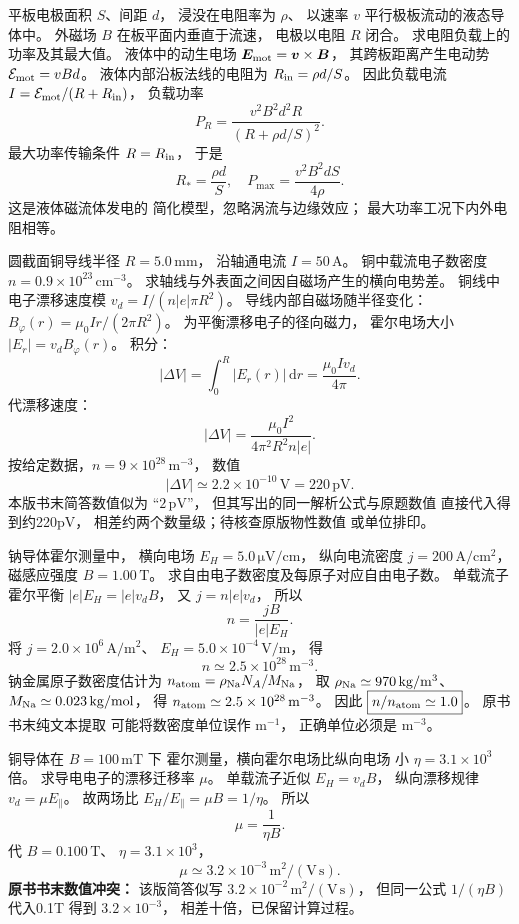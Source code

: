 平板电极面积 $S$、间距 $d$，
浸没在电阻率为 $\rho$、
以速率 $v$ 平行极板流动的液态导体中。
外磁场 $B$ 在板平面内垂直于流速，
电极以电阻 $R$ 闭合。
求电阻负载上的功率及其最大值。
\exsolution
液体中的动生电场
$\bm E_{\rm mot}=\bm v\times\bm B$，
其跨板距离产生电动势
$\mathcal E_{\rm mot}=vBd$。
液体内部沿板法线的电阻为
$R_{\rm in}=\rho d/S$。
因此负载电流
$I=\mathcal E_{\rm mot}/(R+R_{\rm in})$，
负载功率
\[
\boxed{P_R=
\frac{v^2B^2d^2 R}{(R+\rho d/S)^2}}.
\]
最大功率传输条件
$R=R_{\rm in}$，
于是
\[
\boxed{R_*=\frac{\rho d}{S}},
\quad
\boxed{P_{\max}=
\frac{v^2B^2dS}{4\rho}}.
\]
\excheck 这是液体磁流体发电的
简化模型，忽略涡流与边缘效应；
最大功率工况下内外电阻相等。

圆截面铜导线半径
$R=5.0\,\mathrm{mm}$，
沿轴通电流 $I=50\,\mathrm A$。
铜中载流电子数密度
$n=0.9\times10^{23}\,\mathrm{cm^{-3}}$。
求轴线与外表面之间因自磁场产生的横向电势差。
\exsolution
铜线中电子漂移速度模
$v_d=I/(n|e|\pi R^2)$。
导线内部自磁场随半径变化：
$B_\varphi(r)=\mu_0Ir/(2\pi R^2)$。
为平衡漂移电子的径向磁力，
霍尔电场大小
$|E_r|=v_d B_\varphi(r)$。
积分：
\[
|\Delta V|=\int_0^R|E_r(r)|\,\mathrm dr
=\frac{\mu_0Iv_d}{4\pi}.
\]
代漂移速度：
\[
\boxed{|\Delta V|=
\frac{\mu_0I^2}{4\pi^2R^2n|e|}}.
\]
按给定数据，$n=9\times10^{28}\,\mathrm{m^{-3}}$，
数值
\[
\boxed{|\Delta V|\simeq2.2\times10^{-10}\,\mathrm V
=220\,\mathrm{pV}}.
\]
\excheck 本版书末简答数值似为
“$2\,\mathrm{pV}$”，
但其写出的同一解析公式与原题数值
直接代入得到约220pV，
相差约两个数量级；待核查原版物性数值
或单位排印。

钠导体霍尔测量中，
横向电场
$E_H=5.0\,\mathrm{\mu V/cm}$，
纵向电流密度
$j=200\,\mathrm{A/cm^2}$，
磁感应强度 $B=1.00\,\mathrm T$。
求自由电子数密度及每原子对应自由电子数。
\exsolution
单载流子霍尔平衡
$|e|E_H=|e|v_dB$，
又 $j=n|e|v_d$，
所以
\[
\boxed{n=\frac{jB}{|e|E_H}}.
\]
将 $j=2.0\times10^6\,
\mathrm{A/m^2}$、
$E_H=5.0\times10^{-4}\,\mathrm{V/m}$，
得
\[
\boxed{n\simeq2.5\times10^{28}\,\mathrm{m^{-3}}}.
\]
钠金属原子数密度估计为
$n_{\rm atom}=\rho_{\rm Na}N_A/M_{\rm Na}$，
取 $\rho_{\rm Na}\simeq970\,\mathrm{kg/m^3}$、
$M_{\rm Na}\simeq0.023\,\mathrm{kg/mol}$，
得
$n_{\rm atom}\simeq2.5\times10^{28}\,\mathrm{m^{-3}}$。
因此
$\boxed{n/n_{\rm atom}\simeq1.0}$。
\excheck 原书书末纯文本提取
可能将数密度单位误作 $\mathrm{m^{-1}}$，
正确单位必须是 $\mathrm{m^{-3}}$。

铜导体在 $B=100\,\mathrm{mT}$ 下
霍尔测量，横向霍尔电场比纵向电场
小 $\eta=3.1\times10^3$ 倍。
求导电电子的漂移迁移率 $\mu$。
\exsolution
单载流子近似
$E_H=v_dB$，
纵向漂移规律
$v_d=\mu E_\parallel$。
故两场比
$E_H/E_\parallel=\mu B=1/\eta$。
所以
\[
\boxed{\mu=\frac1{\eta B}}.
\]
代 $B=0.100\,\mathrm T$、
$\eta=3.1\times10^3$，
\[
\boxed{\mu\simeq3.2\times10^{-3}\,
\mathrm{m^2/(V\,s)}}.
\]
\excheck \textbf{原书书末数值冲突：}
该版简答似写
$3.2\times10^{-2}\,\mathrm{m^2/(V\,s)}$，
但同一公式 $1/(\eta B)$ 代入0.1T
得到 $3.2\times10^{-3}$，
相差十倍，已保留计算过程。

